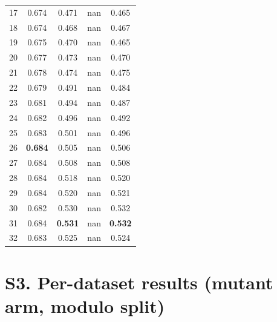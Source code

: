 \documentclass[11pt,a4paper]{article}
\begin{document}
\begin{table}[H]
\begin{tabular}{rcccc}
17 & 0.674 & 0.471 & nan & 0.465 \\

18 & 0.674 & 0.468 & nan & 0.467 \\

19 & 0.675 & 0.470 & nan & 0.465 \\

20 & 0.677 & 0.473 & nan & 0.470 \\

21 & 0.678 & 0.474 & nan & 0.475 \\

22 & 0.679 & 0.491 & nan & 0.484 \\

23 & 0.681 & 0.494 & nan & 0.487 \\

24 & 0.682 & 0.496 & nan & 0.492 \\

25 & 0.683 & 0.501 & nan & 0.496 \\

26 & \textbf{0.684} & 0.505 & nan & 0.506 \\

27 & 0.684 & 0.508 & nan & 0.508 \\

28 & 0.684 & 0.518 & nan & 0.520 \\

29 & 0.684 & 0.520 & nan & 0.521 \\

30 & 0.682 & 0.530 & nan & 0.532 \\

31 & 0.684 & \textbf{0.531} & nan & \textbf{0.532} \\

32 & 0.683 & 0.525 & nan & 0.524 \\

\bottomrule

\end{tabular}

\end{table}

\section*{S3. Per-dataset results (mutant arm, modulo split)}
\end{document}
